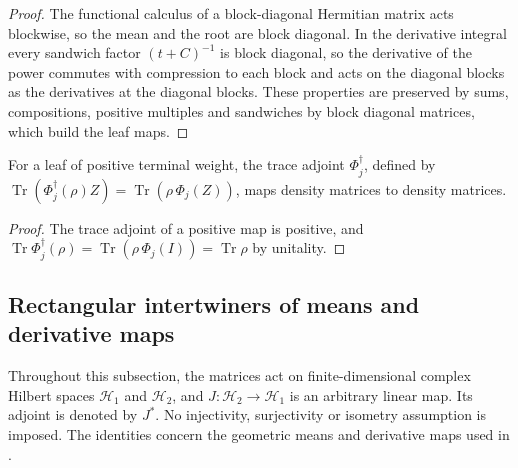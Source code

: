 \begin{proof}\leanok
    The functional calculus of a block-diagonal Hermitian matrix acts blockwise,
    so the mean and the root are block diagonal. In the derivative integral every
    sandwich factor $(t+C)^{-1}$ is block diagonal, so the derivative of the
    power commutes with compression to each block and acts on the diagonal
    blocks as the derivatives at the diagonal blocks. These properties are
    preserved by sums, compositions, positive multiples and sandwiches by block
    diagonal matrices, which build the leaf maps.
\end{proof}

\begin{corollary}\label{cor:mean_tree_leaf_states}
    \leanok
    For a leaf of positive terminal weight, the trace adjoint $\Phi_j^\dagger$,
    defined by $\operatorname{Tr}(\Phi_j^\dagger(\rho)Z)=\operatorname{Tr}(\rho\,\Phi_j(Z))$,
    maps density matrices to density matrices.
\end{corollary}

\begin{proof}\leanok
    The trace adjoint of a positive map is positive, and
    $\operatorname{Tr}\Phi_j^\dagger(\rho)=\operatorname{Tr}(\rho\,\Phi_j(I))=\operatorname{Tr}\rho$
    by unitality.
\end{proof}


\subsection{Rectangular intertwiners of means and derivative maps}

Throughout this subsection, the matrices act on finite-dimensional complex
Hilbert spaces $\mathcal H_1$ and $\mathcal H_2$, and
$J:\mathcal H_2\to\mathcal H_1$ is an arbitrary linear map. Its adjoint is
denoted by $J^*$. No injectivity, surjectivity or isometry assumption is imposed.
The identities concern the geometric means and derivative maps used in
\cite[Section~7]{OpenAI2026AreaLaw}.


